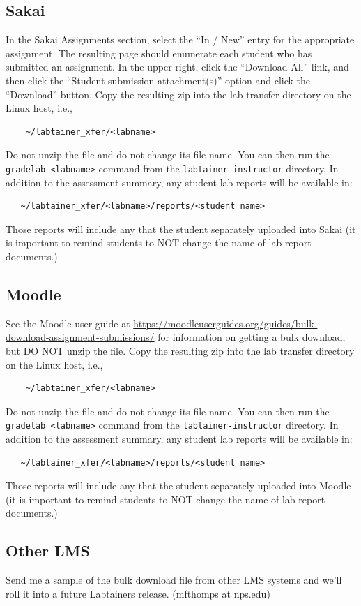 \documentclass[12pt]{article}
\begin{document}
\subsection{Sakai}
In the Sakai Assignments section, select the ``In / New'' entry for the appropriate assignment.
The resulting page should enumerate each student who has submitted an assignment.  In the upper right,
click the ``Download All'' link, and then click the ``Student submission attachment(s)'' option and
click the ``Download'' button.  Copy the resulting zip into the lab transfer directory 
on the Linux host, i.e.,
\begin{verbatim}
    ~/labtainer_xfer/<labname>
\end{verbatim}
\noindent Do not unzip the file and do not change its file name.
You can then run the {\tt gradelab <labname>} command from the {\tt labtainer-instructor} directory.
In addition to the assessment summary, any student lab reports will be available in:
\begin{verbatim}
   ~/labtainer_xfer/<labname>/reports/<student name> 
\end{verbatim}
\noindent Those reports will include any that the student separately uploaded into Sakai (it is 
important to remind students to NOT change the name of lab report documents.)

\subsection{Moodle}
See the Moodle user guide at 
\newline
\url{https://moodleuserguides.org/guides/bulk-download-assignment-submissions/}
for information on getting a bulk download, but DO NOT unzip the file.  Copy the resulting zip into the lab transfer directory 
on the Linux host, i.e.,
\begin{verbatim}
    ~/labtainer_xfer/<labname>
\end{verbatim}
\noindent Do not unzip the file and do not change its file name.
You can then run the {\tt gradelab <labname>} command from the {\tt labtainer-instructor} directory.
In addition to the assessment summary, any student lab reports will be available in:
\begin{verbatim}
   ~/labtainer_xfer/<labname>/reports/<student name> 
\end{verbatim}
\noindent Those reports will include any that the student separately uploaded into Moodle (it is 
important to remind students to NOT change the name of lab report documents.)

\subsection{Other LMS}
Send me a sample of the bulk download file from other LMS systems and we'll roll it into a future Labtainers release. (mfthomps at nps.edu)
\end{document}
